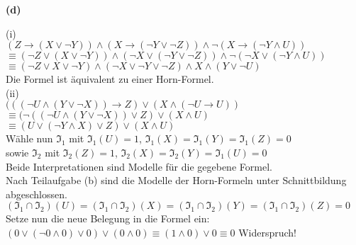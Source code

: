 \documentclass[11pt, a4paper]{article}
\begin{document}
\textbf{(d)}
\begin{adjustwidth}{20pt}{20pt}
(i)\\
$(Z \rightarrow (X \vee \neg Y))\wedge (X \rightarrow (\neg Y \vee \neg Z))\wedge\neg(X \rightarrow (\neg Y \wedge U))$\\
$\equiv (\neg Z \vee (X \vee \neg Y))\wedge (\neg X \vee (\neg Y \vee \neg Z))\wedge\neg(\neg X \vee (\neg Y \wedge U))$\\
$\equiv (\neg Z \vee X \vee \neg Y)\wedge (\neg X \vee \neg Y \vee \neg Z)\wedge  X \wedge  (Y \vee \neg U)$\\

Die Formel ist äquivalent zu einer Horn-Formel.\\
(ii)\\
$(((\neg U \wedge (Y \vee \neg X)) \rightarrow Z) \vee (X \wedge (\neg U \rightarrow U))$\\
$\equiv (\neg((\neg U \wedge (Y \vee \neg X)) \vee Z) \vee (X \wedge U)$\\
$\equiv (U \vee (\neg Y \wedge X) \vee Z) \vee (X \wedge U)$\\

Wähle nun $\mathfrak{I_1}$ mit $\mathfrak{I_1}(U)=1$, $\mathfrak{I_1}(X)=\mathfrak{I_1}(Y)=\mathfrak{I_1}(Z)=0$\\
sowie $\mathfrak{I_2}$ mit $\mathfrak{I_2}(Z)=1$, $\mathfrak{I_2}(X)=\mathfrak{I_2}(Y)=\mathfrak{I_1}(U)=0$\\
Beide Interpretationen sind Modelle für die gegebene Formel.\\
Nach Teilaufgabe (b) sind die Modelle der Horn-Formeln unter Schnittbildung abgeschlossen.\\
$(\mathfrak{I_1} \cap \mathfrak{I_2})(U)=(\mathfrak{I_1} \cap \mathfrak{I_2})(X)=(\mathfrak{I_1} \cap \mathfrak{I_2})(Y)=(\mathfrak{I_1} \cap \mathfrak{I_2})(Z)=0$\\

Setze nun die neue Belegung in die Formel ein:\\

$(0 \vee (\neg 0 \wedge 0) \vee 0) \vee (0 \wedge 0) \equiv (1 \wedge 0) \vee 0 \equiv 0$ \qquad Widerspruch!\\


\end{adjustwidth}
\end{document}
